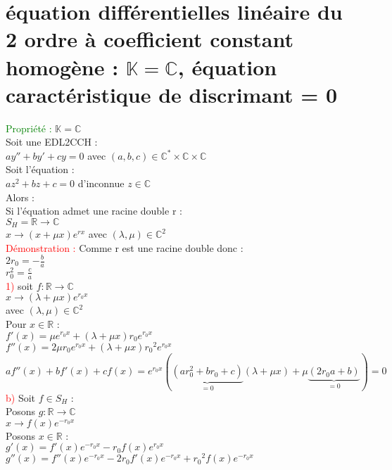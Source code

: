 \documentclass{article}
\begin{document}
	\section{équation différentielles linéaire du 2 ordre à coefficient constant homogène : $\mathbb{K} = \mathbb{C}$, équation caractéristique de discrimant = 0 }
	\textcolor{green}{Propriété :}
	$\mathbb{K} =\mathbb{C}$ \\ 
	Soit une EDL2CCH : \\ 
	$ay''+by'+cy=0$ avec $(a,b,c) \in \mathbb{C}^* \times \mathbb{C} \times \mathbb{C}$ \\ 
	Soit l'équation : \\ 
	$az^2+bz+c=0$ d'inconnue $z \in \mathbb{C}$ \\ 
	Alors : \\ 
	Si l'équation admet une racine double r : \\ 
	$S_H=\mathbb{R} \rightarrow \mathbb{C}$ \\ 
	\indent $x \rightarrow (x+\mu x)e^{rx}$ avec $(\lambda , \mu ) \in \mathbb{C}^2$ \\ 
	\textcolor{red}{Démonstration :} Comme r est une racine double donc : \\ 
	$2r_0=-\frac{b}{a}$ \\ 
	$r_0^2=\frac{c}{a}$ \\ 
	\textcolor{red}{1)} soit $f : \mathbb{R} \rightarrow \mathbb{C}$ \\ 
	\indent $x \rightarrow (\lambda + \mu x)e^{r_0x}$ \\ 
	avec $(\lambda,\mu) \in \mathbb{C}^2$ \\ 
	Pour $x \in \mathbb{R}$ : \\ 
	$f'(x)=\mu e^{r_0x}+(\lambda +\mu x)r_0e^{r_0x}$ \\ 
	$f''(x)=2\mu r_0 e^{r_0x}+(\lambda + \mu x){r_0}^2 e^{r_0x}$ \\ 
	$af''(x)+bf'(x)+cf(x)=e^{r_0x}(\underbrace{(ar_0^2+br_0+c)}_{=0}(\lambda + \mu x)+\mu\underbrace{(2r_0a+b)}_{=0})=0$ \\ 
	\textcolor{red}{b)} Soit $f \in S_H$ : \\ 
	Posons $g: \mathbb{R} \rightarrow \mathbb{C}$ \\ 
	\indent $x \rightarrow f(x) e^{-r_0x}$ \\ 
	Posons $x \in \mathbb{R}$ : \\ 
	$g'(x)=f'(x)e^{-r_0x}-r_0f(x)e^{r_0x}$ \\ 
	$g''(x)= f''(x)e^{-r_0x}-2r_0f'(x)e^{-r_0x}+{r_0}^2f(x)e^{-r_0x}$ \\ 
\end{document}
